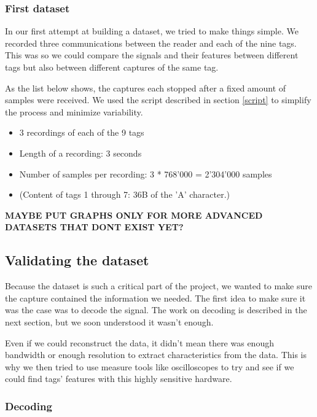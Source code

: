 \subsubsection{First dataset}

In our first attempt at building a dataset, we tried to make things simple. We recorded three communications between the reader and each of the nine tags. This was so we could compare the signals and their features between different tags but also between different captures of the same tag.

As the list below shows, the captures each stopped after a fixed amount of samples were received. We used the script described in section \ref{script} to simplify the process and minimize variability.

\begin{itemize}
  \item 3 recordings of each of the 9 tags
  \item Length of a recording: 3 seconds
  \item Number of samples per recording: 3 * 768'000 = 2'304'000 samples
  \item (Content of tags 1 through 7: 36B of the 'A' character.)
\end{itemize}

\textbf{MAYBE PUT GRAPHS ONLY FOR MORE ADVANCED DATASETS THAT DONT EXIST YET?}

\subsection{Validating the dataset} \label{validation}

Because the dataset is such a critical part of the project, we wanted to make sure the capture contained the information we needed. The first idea to make sure it was the case was to decode the signal. The work on decoding is described in the next section, but we soon understood it wasn't enough.

Even if we could reconstruct the data, it didn't mean there was enough bandwidth or enough resolution to extract characteristics from the data. This is why we then tried to use measure tools like oscilloscopes to try and see if we could find tags' features with this highly sensitive hardware.

\subsubsection{Decoding}

